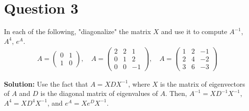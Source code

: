 \documentclass{article}
\begin{document}
\newpage
\section*{Question 3}
In each of the following, "diagonalize" the matrix $X$ and use it to compute $A^{-1}$, $A^4$, $e^A$.
\begin{align*}
    A = \begin{pmatrix} 0 & 1 \\ 1 & 0 \end{pmatrix}, \quad
    A = \begin{pmatrix} 2 & 2 & 1 \\ 0 & 1 & 2 \\ 0 & 0 & -1 \end{pmatrix}, \quad
    A = \begin{pmatrix} 1 & 2 & -1 \\ 2 & 4 & -2 \\ 3 & 6 & -3 \end{pmatrix}
\end{align*}

\vspace{0.25cm}\noindent\textbf{Solution:}
Use the fact that $A = XDX^{-1}$, where $X$ is the matrix of eigenvectors of $A$ and $D$ is the diagonal matrix of eigenvalues of $A$.
Then, $A^{-1} = XD^{-1}X^{-1}$, $A^4 = XD^4X^{-1}$, and $e^A = Xe^DX^{-1}$.
\end{document}
